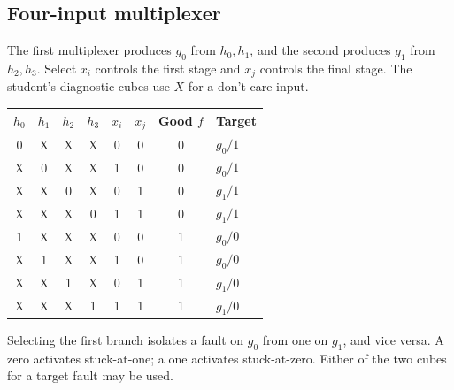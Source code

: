 \documentclass[11pt,a4paper]{article}
\begin{document}
\subsection{Four-input multiplexer}
The first multiplexer produces $g_0$ from $h_0,h_1$, and the second produces $g_1$ from $h_2,h_3$. Select $x_i$ controls the first stage and $x_j$ controls the final stage. The student's diagnostic cubes use $X$ for a don't-care input.
\begin{center}
\begin{tabular}{cccccc|c|l}\toprule
$h_0$&$h_1$&$h_2$&$h_3$&$x_i$&$x_j$&Good $f$&Target\\\midrule
0&X&X&X&0&0&0&$g_0/1$\\
X&0&X&X&1&0&0&$g_0/1$\\
X&X&0&X&0&1&0&$g_1/1$\\
X&X&X&0&1&1&0&$g_1/1$\\
1&X&X&X&0&0&1&$g_0/0$\\
X&1&X&X&1&0&1&$g_0/0$\\
X&X&1&X&0&1&1&$g_1/0$\\
X&X&X&1&1&1&1&$g_1/0$\\\bottomrule
\end{tabular}\end{center}
Selecting the first branch isolates a fault on $g_0$ from one on $g_1$, and vice versa. A zero activates stuck-at-one; a one activates stuck-at-zero. Either of the two cubes for a target fault may be used.
\end{document}
